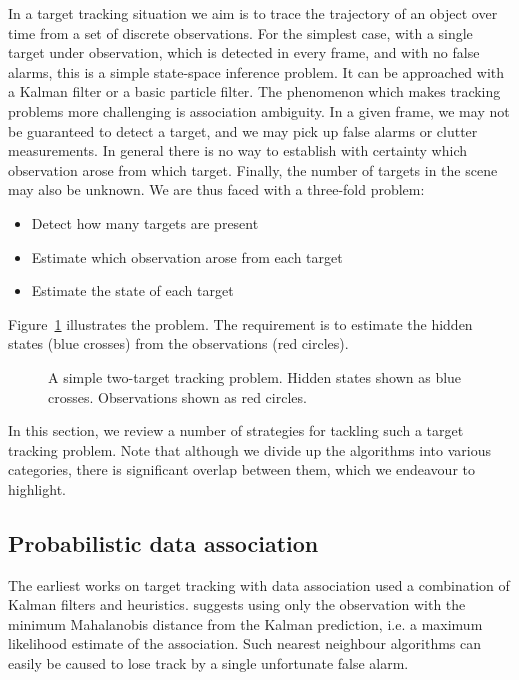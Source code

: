 In a target tracking situation we aim is to trace the trajectory of an object over time from a set of discrete observations. For the simplest case, with a single target under observation, which is detected in every frame, and with no false alarms, this is a simple state-space inference problem. It can be approached with a Kalman filter or a basic particle filter. The phenomenon which makes tracking problems more challenging is association ambiguity. In a given frame, we may not be guaranteed to detect a target, and we may pick up false alarms or clutter measurements. In general there is no way to establish with certainty which observation arose from which target. Finally, the number of targets in the scene may also be unknown. We are thus faced with a three-fold problem:

\begin{itemize}
	\item Detect how many targets are present
	\item Estimate which observation arose from each target
	\item Estimate the state of each target
\end{itemize}

Figure~\ref{fig:BasicTracking} illustrates the problem. The requirement is to estimate the hidden states (blue crosses) from the observations (red circles).

\begin{figure} \centering
%
\caption{A simple two-target tracking problem. Hidden states shown as blue crosses. Observations shown as red circles.}
\label{fig:BasicTracking}%
\end{figure}

In this section, we review a number of strategies for tackling such a target tracking problem. Note that although we divide up the algorithms into various categories, there is significant overlap between them, which we endeavour to highlight.

\subsection{Probabilistic data association}
The earliest works on target tracking with data association used a combination of Kalman filters and heuristics. \cite{Sea1971} suggests using only the observation with the minimum Mahalanobis distance from the Kalman prediction, i.e. a maximum likelihood estimate of the association. Such nearest neighbour algorithms can easily be caused to lose track by a single unfortunate false alarm.

